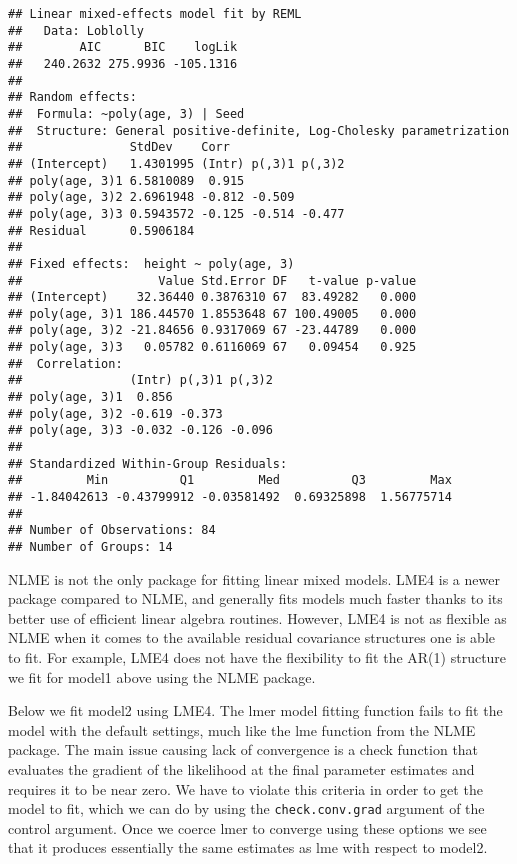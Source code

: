\documentclass[
]{book}
\begin{document}
\begin{verbatim}
## Linear mixed-effects model fit by REML
##   Data: Loblolly 
##        AIC      BIC    logLik
##   240.2632 275.9936 -105.1316
## 
## Random effects:
##  Formula: ~poly(age, 3) | Seed
##  Structure: General positive-definite, Log-Cholesky parametrization
##               StdDev    Corr                
## (Intercept)   1.4301995 (Intr) p(,3)1 p(,3)2
## poly(age, 3)1 6.5810089  0.915              
## poly(age, 3)2 2.6961948 -0.812 -0.509       
## poly(age, 3)3 0.5943572 -0.125 -0.514 -0.477
## Residual      0.5906184                     
## 
## Fixed effects:  height ~ poly(age, 3) 
##                   Value Std.Error DF   t-value p-value
## (Intercept)    32.36440 0.3876310 67  83.49282   0.000
## poly(age, 3)1 186.44570 1.8553648 67 100.49005   0.000
## poly(age, 3)2 -21.84656 0.9317069 67 -23.44789   0.000
## poly(age, 3)3   0.05782 0.6116069 67   0.09454   0.925
##  Correlation: 
##               (Intr) p(,3)1 p(,3)2
## poly(age, 3)1  0.856              
## poly(age, 3)2 -0.619 -0.373       
## poly(age, 3)3 -0.032 -0.126 -0.096
## 
## Standardized Within-Group Residuals:
##         Min          Q1         Med          Q3         Max 
## -1.84042613 -0.43799912 -0.03581492  0.69325898  1.56775714 
## 
## Number of Observations: 84
## Number of Groups: 14
\end{verbatim}

NLME is not the only package for fitting linear mixed models. LME4 is a newer package compared to NLME, and generally fits models much faster thanks to its better use of efficient linear algebra routines. However, LME4 is not as flexible as NLME when it comes to the available residual covariance structures one is able to fit. For example, LME4 does not have the flexibility to fit the AR(1) structure we fit for model1 above using the NLME package.

Below we fit model2 using LME4. The lmer model fitting function fails to fit the model with the default settings, much like the lme function from the NLME package. The main issue causing lack of convergence is a check function that evaluates the gradient of the likelihood at the final parameter estimates and requires it to be near zero. We have to violate this criteria in order to get the model to fit, which we can do by using the \texttt{check.conv.grad} argument of the control argument. Once we coerce lmer to converge using these options we see that it produces essentially the same estimates as lme with respect to model2.
\end{document}

